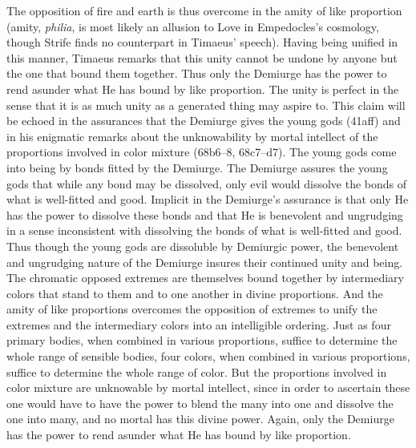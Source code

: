 The opposition of fire and earth is thus overcome in the amity of like proportion (amity, \emph{philia}, is most likely an allusion to Love in Empedocles's cosmology, though Strife finds no counterpart in Timaeus' speech). Having being unified in this manner, Timaeus remarks that this unity cannot be undone by anyone but the one that bound them together. Thus only the Demiurge has the power to rend asunder what He has bound by like proportion. The unity is perfect in the sense that it is as much unity as a generated thing may aspire to. This claim will be echoed in the assurances that the Demiurge gives the young gods (41aff) and in his enigmatic remarks about the unknowability by mortal intellect of the proportions involved in color mixture (68b6–8, 68c7–d7). The young gods come into being by bonds fitted by the Demiurge. The Demiurge assures the young gods that while any bond may be dissolved, only evil would dissolve the bonds of what is well-fitted and good. Implicit in the Demiurge's assurance is that only He has the power to dissolve these bonds and that He is benevolent and ungrudging in a sense inconsistent with dissolving the bonds of what is well-fitted and good. Thus though the young gods are dissoluble by Demiurgic power, the benevolent and ungrudging nature of the Demiurge insures their continued unity and being. The chromatic opposed extremes are themselves bound together by intermediary colors that stand to them and to one another in divine proportions. And the amity of like proportions overcomes the opposition of extremes to unify the extremes and the intermediary colors into an intelligible ordering. Just as four primary bodies, when combined in various proportions, suffice to determine the whole range of sensible bodies, four colors, when combined in various proportions, suffice to determine the whole range of color. But the proportions involved in color mixture are unknowable by mortal intellect, since in order to ascertain these one would have to have the power to blend the many into one and dissolve the one into many, and no mortal has this divine power. Again, only the Demiurge has the power to rend asunder what He has bound by like proportion.

